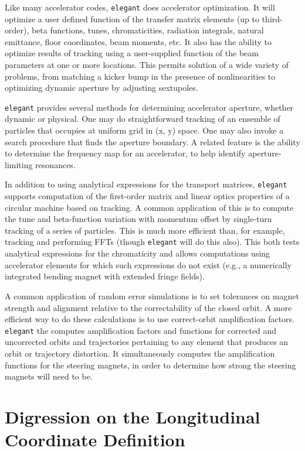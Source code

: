 \documentclass[11pt]{article}
\begin{document}
Like many accelerator codes, {\tt elegant} does accelerator
optimization.  It will optimize a user defined function of the
transfer matrix elements (up to third-order), beta functions, tunes,
chromaticities, radiation integrals, natural emittance, floor
coordinates, beam moments, etc.  It also has the ability to optimize results of
tracking using a user-supplied function of the beam parameters at one
or more locations.  This permits solution of a wide variety of
problems, from matching a kicker bump in the presence of
nonlinearities to optimizing dynamic aperture by adjusting sextupoles.

{\tt elegant} provides several methods for determining accelerator
aperture, whether dynamic or physical.  One may do straightforward
tracking of an ensemble of particles that occupies at uniform grid in
(x, y) space.  One may also invoke a search procedure that finds the
aperture boundary.  A related feature is the ability to determine
the frequency map for an accelerator, to help identify aperture-limiting
resonances.

In addition to using analytical expressions for the transport
matrices, {\tt elegant} supports computation of the first-order matrix
and linear optics properties of a circular machine based on tracking.
A common application of this is to compute the tune and beta-function
variation with momentum offset by single-turn tracking of a series of
particles.  This is much more efficient than, for example, tracking
and performing FFTs (though {\tt elegant} will do this also).  This
both tests analytical expressions for the chromaticity and allows
computations using accelerator elements for which such expressions do
not exist (e.g., a numerically integrated bending magnet with extended
fringe fields).

A common application of random error simulations is to set tolerances
on magnet strength and alignment relative to the correctability of the
closed orbit.  A more efficient way to do these calculations is to use
correct-orbit amplification factors\cite{Borland_PC}.  {\tt elegant}
the computes amplification factors and functions for corrected and
uncorrected orbits and trajectories pertaining to any element that
produces an orbit or trajectory distortion.  It simultaneously
computes the amplification functions for the steering magnets, in
order to determine how strong the steering magnets will need to be.

\section{Digression on the Longitudinal Coordinate Definition\label{sec:longitCoord}}
\end{document}
